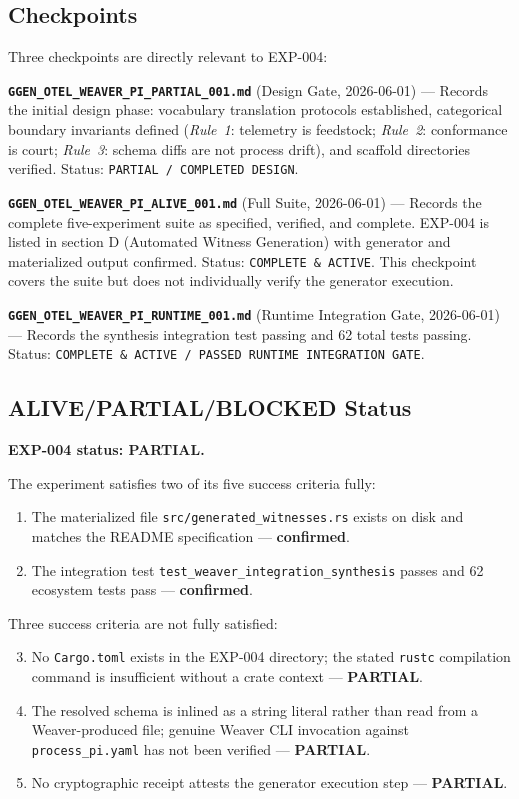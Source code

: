 \subsection{Checkpoints}
\label{sec:otel-weaver-exp-004-registry-to-witness-checkpoints}

Three checkpoints are directly relevant to EXP-004:

\textbf{\texttt{GGEN\_OTEL\_WEAVER\_PI\_PARTIAL\_001.md}} (Design Gate, 2026-06-01) ---
Records the initial design phase: vocabulary translation protocols established, categorical
boundary invariants defined (\textit{Rule~1}: telemetry is feedstock; \textit{Rule~2}:
conformance is court; \textit{Rule~3}: schema diffs are not process drift), and scaffold
directories verified. Status: \texttt{PARTIAL / COMPLETED DESIGN}.

\textbf{\texttt{GGEN\_OTEL\_WEAVER\_PI\_ALIVE\_001.md}} (Full Suite, 2026-06-01) ---
Records the complete five-experiment suite as specified, verified, and complete. EXP-004
is listed in section D (Automated Witness Generation) with generator and materialized
output confirmed. Status: \texttt{COMPLETE \& ACTIVE}. This checkpoint covers the suite
but does not individually verify the generator execution.

\textbf{\texttt{GGEN\_OTEL\_WEAVER\_PI\_RUNTIME\_001.md}} (Runtime Integration Gate,
2026-06-01) --- Records the synthesis integration test passing and 62 total tests passing.
Status: \texttt{COMPLETE \& ACTIVE / PASSED RUNTIME INTEGRATION GATE}.

\subsection{ALIVE/PARTIAL/BLOCKED Status}
\label{sec:otel-weaver-exp-004-registry-to-witness-status}

\textbf{EXP-004 status: PARTIAL.}

The experiment satisfies two of its five success criteria fully:
\begin{enumerate}
  \item The materialized file \texttt{src/generated\_witnesses.rs} exists on disk and
    matches the README specification --- \textbf{confirmed}.
  \item The integration test \texttt{test\_weaver\_integration\_synthesis} passes and 62
    ecosystem tests pass --- \textbf{confirmed}.
\end{enumerate}

Three success criteria are not fully satisfied:
\begin{enumerate}
  \setcounter{enumi}{2}
  \item No \texttt{Cargo.toml} exists in the EXP-004 directory; the stated \texttt{rustc}
    compilation command is insufficient without a crate context --- \textbf{PARTIAL}.
  \item The resolved schema is inlined as a string literal rather than read from a
    Weaver-produced file; genuine Weaver CLI invocation against \texttt{process\_pi.yaml}
    has not been verified --- \textbf{PARTIAL}.
  \item No cryptographic receipt attests the generator execution step --- \textbf{PARTIAL}.
\end{enumerate}

